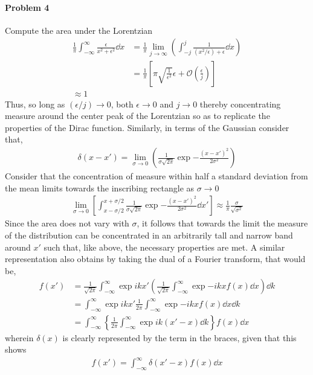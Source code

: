 \documentclass[10pt]{scrartcl}
\begin{document}
\paragraph{Problem 4}
Compute the area under the Lorentzian 
\begin{align}
\frac{1}{\pi}\int_{-\infty}^{\infty}\frac{\epsilon}{x^2 + \epsilon^2}\dd{x} &=\frac{1}{\pi} \lim_{j\to\infty}\left(\int_{-j}^{j}\frac{1}{(x^2/\epsilon) + \epsilon}\dd{x}\right)\\
&=\frac{1}{\pi}\left[ \pi\sqrt{\frac{1}{\epsilon^2}}\epsilon + \mathcal{O}\left(\frac{\epsilon}{j}\right)\right]\\
\approx 1 
\end{align}
Thus, so long as $(\epsilon/j)\to 0$, both $\epsilon\to 0$ and $j\to 0$ thereby concentrating measure around the center peak of the Lorentzian so as to replicate the properties of the Dirac function. Similarly, in terms of the Gaussian consider that,
\begin{align}
	\delta(x-x') = \lim_{\sigma\to 0}\left(\frac{1}{\sigma\sqrt{2\pi}}\exp{-\frac{(x-x')^2}{2\sigma^2}}\right)
\end{align}
Consider that the concentration of measure within half a standard deviation from the mean limits towards the inscribing rectangle as $\sigma\to 0$
\begin{align}
		\lim_{\sigma\to 0}\left[\int_{x-\sigma/2}^{x+\sigma/2}\frac{1}{\sigma\sqrt{2\pi}}\exp{-\frac{(x-x')^2}{2\sigma^2}}\dd{x'}\right] \approx \frac{1}{\pi}\frac{\sigma}{\sqrt{\sigma^2}}
\end{align}
Since the area does not vary with $\sigma$, it follows that towards the limit the measure of the distribution can be concentrated in an arbitrarily tall and narrow band around $x'$ such that, like above, the necessary properties are met. A similar representation also obtains by taking the dual of a Fourier transform, that would be,
\begin{align}
	f(x') &= \frac{1}{\sqrt{2\pi}}\int_{-\infty}^{\infty}\exp{i k x'}\left(\frac{1}{\sqrt{2\pi}}\int_{-\infty}^{\infty}\exp{-i k x}f(x)\dd{x}\right)\dd{k}\\
	&= \int_{-\infty}^{\infty}\exp{i k x'}\frac{1}{2\pi}\int_{-\infty}^{\infty}\exp{-i k x}f(x)\dd{x}\dd{k}\\
	&= \int_{-\infty}^{\infty}\left\{\frac{1}{2\pi}\int_{-\infty}^{\infty}\exp{i k (x'-x)}\dd{k}\right\}f(x)\dd{x}
\end{align}
wherein $\delta(x)$ is clearly represented by the term in the braces, given that this shows
\begin{align}
f(x') = \int_{-\infty}^{\infty}\delta(x'-x)f(x)\dd{x}	
\end{align}
\end{document}
